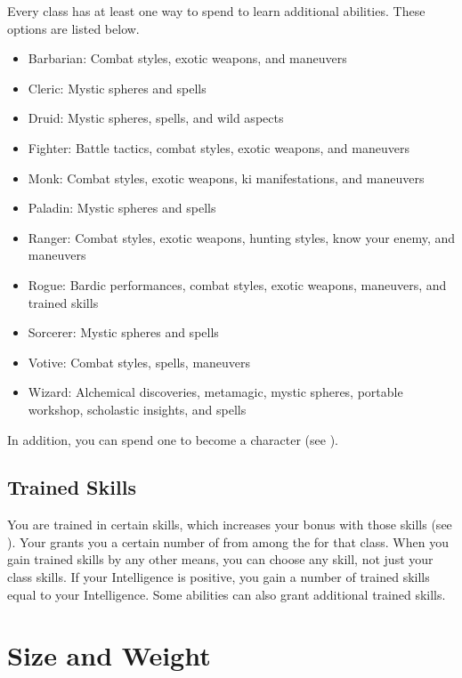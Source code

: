     Every class has at least one way to spend  to learn additional abilities.
    These options are listed below.
    \begin{itemize}
      \item Barbarian: Combat styles, exotic weapons, and maneuvers
      \item Cleric: Mystic spheres and spells
      \item Druid: Mystic spheres, spells, and wild aspects
      \item Fighter: Battle tactics, combat styles, exotic weapons, and maneuvers
      \item Monk: Combat styles, exotic weapons, ki manifestations, and maneuvers
      \item Paladin: Mystic spheres and spells
      \item Ranger: Combat styles, exotic weapons, hunting styles, know your enemy, and maneuvers
      \item Rogue: Bardic performances, combat styles, exotic weapons, maneuvers, and trained skills
      \item Sorcerer: Mystic spheres and spells
      \item Votive: Combat styles, spells, maneuvers
      \item Wizard: Alchemical discoveries, metamagic, mystic spheres, portable workshop, scholastic insights, and spells
    \end{itemize}

    In addition, you can spend one  to become a  character (see ).

  \subsection{Trained Skills}\label{Trained Skills}
    You are trained in certain skills, which increases your bonus with those skills (see ).
    Your  grants you a certain number of  from among the  for that class.
    When you gain trained skills by any other means, you can choose any skill, not just your class skills.
    If your Intelligence is positive, you gain a number of trained skills equal to your Intelligence.
    Some abilities can also grant additional trained skills.

\section{Size and Weight}\label{Size and Weight}

